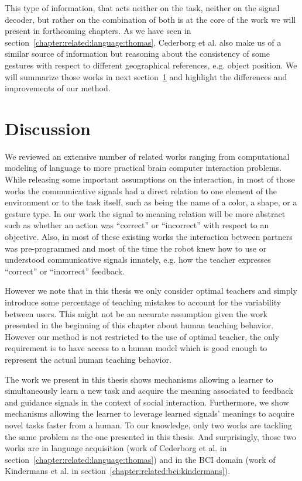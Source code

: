 \transition

This type of information, that acts neither on the task, neither on the signal decoder, but rather on the combination of both is at the core of the work we will present in forthcoming chapters. As we have seen in section~\ref{chapter:related:language:thomas}, Cederborg et al. also make us of a similar source of information but reasoning about the consistency of some gestures with respect to different geographical references, e.g. object position. We will summarize those works in next section~\ref{chapter:related:discussion} and highlight the differences and improvements of our method.

\section{Discussion}
\label{chapter:related:discussion}

We reviewed an extensive number of related works ranging from computational modeling of language to more practical brain computer interaction problems. While releasing some important assumptions on the interaction, in most of those works the communicative signals had a direct relation to one element of the environment or to the task itself, such as being the name of a color, a shape, or a gesture type. In our work the signal to meaning relation will be more abstract such as whether an action was ``correct'' or ``incorrect'' with respect to an objective. Also, in most of these existing works the interaction between partners was pre-programmed and most of the time the robot knew how to use or understood communicative signals innately, e.g. how the teacher expresses ``correct'' or ``incorrect'' feedback. 

However we note that in this thesis we only consider optimal teachers and simply introduce some percentage of teaching mistakes to account for the variability between users. This might not be an accurate assumption given the work presented in the beginning of this chapter about human teaching behavior. However our method is not restricted to the use of optimal teacher, the only requirement is to have access to a human model which is good enough to represent the actual human teaching behavior.

The work we present in this thesis shows mechanisms allowing a learner to simultaneously learn a new task and acquire the meaning associated to feedback and guidance signals in the context of social interaction. Furthermore, we show mechanisms allowing the learner to leverage learned signals' meanings to acquire novel tasks faster from a human. To our knowledge, only two works are tackling the same problem as the one presented in this thesis. And surprisingly, those two works are in language acquisition (work of Cederborg et al. in section~\ref{chapter:related:language:thomas}) and in the BCI domain (work of Kindermans et al. in section~\ref{chapter:related:bci:kindermans}). 

